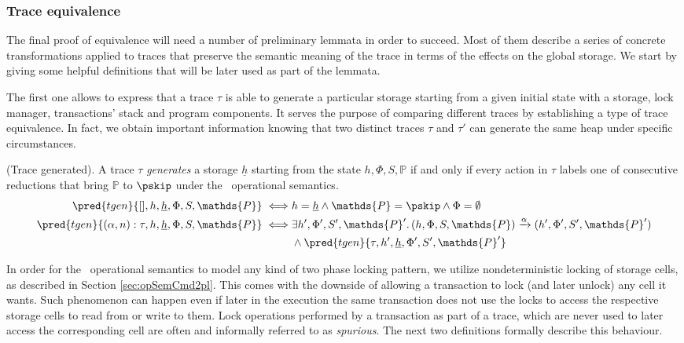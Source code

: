 \subsubsection{Trace equivalence}

The final proof of equivalence will need a number of preliminary lemmata in order to succeed. Most of them describe a series of concrete transformations applied to traces that preserve the semantic meaning of the trace in terms of the effects on the global storage. We start by giving some helpful definitions that will be later used as part of the lemmata.

The first one allows to express that a trace $\tau$ is able to generate a particular storage starting from a given initial state with a storage, lock manager, transactions' stack and program components. It serves the purpose of comparing different traces by establishing a type of trace equivalence. In fact, we obtain important information knowing that two distinct traces $\tau$ and $\tau'$ can generate the same heap under specific circumstances.

\begin{defn}
	(Trace generated).
	A trace $\tau$ \emph{generates} a storage $\underline{h}$ starting from the state $h, \Phi, S, \mathds{P}$ if and only if every action in $\tau$ labels one of consecutive reductions that bring $\mathds{P}$ to $\pskip$ under the \tpl\ operational semantics.
	\begin{align*}
		\pred{tgen}{[], h, \underline{h}, \Phi, S, \mathds{P}}
			\iff&
		h = \underline{h} \land \mathds{P} = \pskip \land \Phi = \emptyset
			\\
		\pred{tgen}{(\alpha, n) : \tau, h, \underline{h}, \Phi, S, \mathds{P}}
			\iff&
		\exists h', \Phi', S', \mathds{P}' \ldotp (h, \Phi, S, \mathds{P}) \xrightarrow{\alpha} (h', \Phi', S', \mathds{P}') \\ &\land \pred{tgen}{\tau, h', \underline{h}, \Phi', S', \mathds{P}'}
	\end{align*}
\end{defn}

In order for the \tpl\ operational semantics to model any kind of two phase locking pattern, we utilize nondeterministic locking of storage cells, as described in Section \ref{sec:opSemCmd2pl}. This comes with the downside of allowing a transaction to lock (and later unlock) any cell it wants. Such phenomenon can happen even if later in the execution the same transaction does not use the locks to access the respective storage cells to read from or write to them. Lock operations performed by a transaction as part of a trace, which are never used to later access the corresponding cell are often and informally referred to as \textit{spurious}. The next two definitions formally describe this behaviour.


